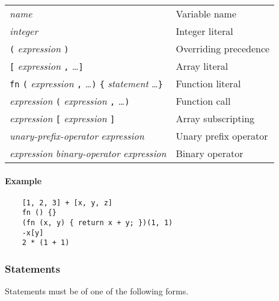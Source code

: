 \begin{table}[H]
    \begin{tabular}{ l l }
        \textit{name}                                                                                               & Variable name         \\
        \textit{integer}                                                                                            & Integer literal       \\
        \verb|(| \textit{expression} \verb|)|                                                                       & Overriding precedence \\
        \verb|[| \textit{expression} \verb|,| \ldots \verb|]|                                                       & Array literal         \\
        \verb|fn| \verb|(| \textit{expression} \verb|,| \ldots \verb|)| \verb|{| \textit{statement} \ldots \verb|}| & Function literal      \\
        \textit{expression} \verb|(| \textit{expression} \verb|,| \ldots \verb|)|                                   & Function call         \\
        \textit{expression} \verb|[| \textit{expression} \verb|]|                                                   & Array subscripting    \\
        \textit{unary-prefix-operator} \textit{expression}                                                          & Unary prefix operator \\
        \textit{expression} \textit{binary-operator} \textit{expression}                                            & Binary operator
    \end{tabular}
\end{table}

\paragraph{Example}

\begin{verbatim}
    [1, 2, 3] + [x, y, z]
    fn () {}
    (fn (x, y) { return x + y; })(1, 1)
    -x[y]
    2 * (1 + 1)
\end{verbatim}

\subsubsection{Statements}

Statements must be of one of the following forms.

